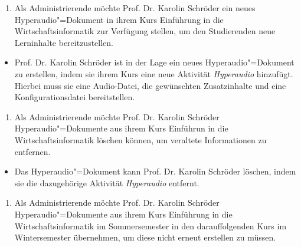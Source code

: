 \begin{enumerate}[leftmargin=1.11cm,label=US-\arabic*:,ref=US-\arabic*]
\item \label{US-Admin-Erstellen-Eval} Als Administrierende möchte Prof. Dr. Karolin Schröder ein neues Hyperaudio"=Dokument in ihrem Kurs \glqq Einführung in die Wirtschaftsinformatik\grqq{} zur Verfügung stellen, um den Studierenden neue Lerninhalte bereitzustellen.
\end{enumerate}
\vspace{-0.25cm}
\begin{itemize}
\item[\Checkmark] Prof. Dr. Karolin Schröder ist in der Lage ein neues Hyperaudio"=Dokument zu erstellen, indem sie ihrem Kurs eine neue Aktivität \textit{Hyperaudio} hinzufügt. Hierbei muss sie eine Audio-Datei, die gewünschten Zusatzinhalte und eine Konfigurationsdatei bereitstellen.
\end{itemize}
\vspace{0.25cm}
\begin{enumerate}[resume*]
\item \label{US-Admin-Loeschen-Eval} Als Administrierende möchte Prof. Dr. Karolin Schröder Hyperaudio"=Dokumente aus ihrem Kurs \glqq Einführun in die Wirtschaftsinformatik\grqq{} löschen können, um veraltete Informationen zu entfernen.
\end{enumerate}
\vspace{-0.1cm}
\begin{itemize}
\item[\Checkmark] 
Das Hyperaudio"=Dokument kann Prof. Dr. Karolin Schröder löschen, indem sie die dazugehörige Aktivität \textit{Hyperaudio} entfernt.
\end{itemize}
\vspace{0.25cm}
\begin{enumerate}[resume*]
\item \label{US-Admin-Semester-Eval} Als Administrierende möchte Prof. Dr. Karolin Schröder Hyperaudio"=Dokumente aus ihrem Kurs \glqq Einführung in die Wirtschaftsinformatik\grqq{} im Sommersemester in den darauffolgenden Kurs im Wintersemester übernehmen, um diese nicht erneut erstellen zu müssen.
\end{enumerate}
